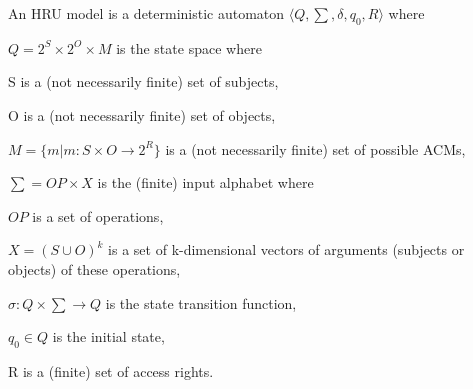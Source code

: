 \documentclass[a4paper]{article}
\begin{document}
\begin{multicols}{3}
    An HRU model is a deterministic automaton $⟨Q,\sum,\delta,q_0 ,R⟩$ where
    \begin{itemize*}
        \item $Q= 2^S\times 2^O\times  M$ is the state space where
              \begin{itemize*}
                  \item S is a (not necessarily finite) set of subjects,
                  \item O is a (not necessarily finite) set of objects,
                  \item $M=\{m|m:S\times O\rightarrow 2^R\}$ is a (not necessarily finite) set of possible ACMs,
              \end{itemize*}
        \item $\sum=OP\times X$ is the (finite) input alphabet where
              \begin{itemize*}
                  \item $OP$ is a set of operations,
                  \item $X=(S\cup O)^k$ is a set of k-dimensional vectors of arguments (subjects or objects) of these operations,
              \end{itemize*}
        \item $\sigma:Q\times\sum\rightarrow Q$ is the state transition function,
        \item $q_0\in Q$ is the initial state,
        \item R is a (finite) set of access rights.
    \end{itemize*}



\end{multicols}
\end{document}
